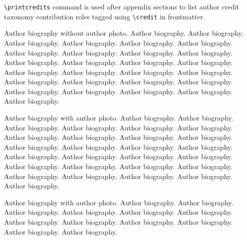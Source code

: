 \documentclass[a4paper,fleqn]{cas-sc}
\begin{document}
\verb+\printcredits+ command is used after appendix sections to list 
author credit taxonomy contribution roles tagged using \verb+\credit+ 
in frontmatter.

\printcredits

%






\bio{}
Author biography without author photo.
Author biography. Author biography. Author biography.
Author biography. Author biography. Author biography.
Author biography. Author biography. Author biography.
Author biography. Author biography. Author biography.
Author biography. Author biography. Author biography.
Author biography. Author biography. Author biography.
Author biography. Author biography. Author biography.
Author biography. Author biography. Author biography.
Author biography. Author biography. Author biography.
\endbio

Author biography with author photo.
Author biography. Author biography. Author biography.
Author biography. Author biography. Author biography.
Author biography. Author biography. Author biography.
Author biography. Author biography. Author biography.
Author biography. Author biography. Author biography.
Author biography. Author biography. Author biography.
Author biography. Author biography. Author biography.
Author biography. Author biography. Author biography.
Author biography. Author biography. Author biography.
\endbio

\vskip3pc

Author biography with author photo.
Author biography. Author biography. Author biography.
Author biography. Author biography. Author biography.
Author biography. Author biography. Author biography.
Author biography. Author biography. Author biography.
\endbio
\end{document}
